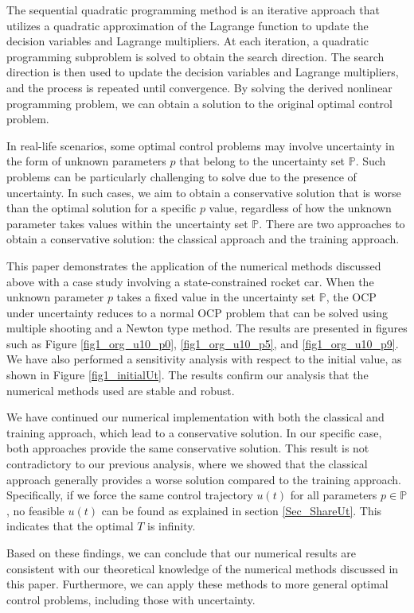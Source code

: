 \documentclass  [
  paper    = a4,
  BCOR     = 10mm,
  twoside,
  fontsize = 12pt,
  fleqn,
  toc      = bibnumbered,
  toc      = listofnumbered,
  numbers  = noendperiod,
  headings = normal,
  listof   = leveldown,
  version  = 3.03
]                                       {scrreprt}
\newcommand{\<}{\langle}
\renewcommand{\>}{\rangle}
\begin{document}
The sequential quadratic programming method is an iterative approach that utilizes a quadratic approximation of the Lagrange function to update the decision variables and Lagrange multipliers. At each iteration, a quadratic programming subproblem is solved to obtain the search direction. The search direction is then used to update the decision variables and Lagrange multipliers, and the process is repeated until convergence. By solving the derived nonlinear programming problem, we can obtain a solution to the original optimal control problem.


In real-life scenarios, some optimal control problems may involve uncertainty in the form of unknown parameters $p$ that belong to the uncertainty set $\mathbb{P}$. Such problems can be particularly challenging to solve due to the presence of uncertainty. In such cases, we aim to obtain a conservative solution that is worse than the optimal solution for a specific $p$ value, regardless of how the unknown parameter takes values within the uncertainty set $\mathbb{P}$. There are two approaches to obtain a conservative solution: the classical approach and the training approach.

This paper demonstrates the application of the numerical methods discussed above with a case study involving a state-constrained rocket car. When the unknown parameter $p$ takes a fixed value in the uncertainty set $\mathbb{P}$, the OCP under uncertainty reduces to a normal OCP problem that can be solved using multiple shooting and a Newton type method. The results are presented in figures such as Figure \ref{fig1_org_u10_p0}, \ref{fig1_org_u10_p5}, and \ref{fig1_org_u10_p9}. We have also performed a sensitivity analysis with respect to the initial value, as shown in Figure \ref{fig1_initialUt}. The results confirm our analysis that the numerical methods used are stable and robust.

We have continued our numerical implementation with both the classical and training approach, which lead to a conservative solution. In our specific case, both approaches provide the same conservative solution. This result is not contradictory to our previous analysis, where we showed that the classical approach generally provides a worse solution compared to the training approach. Specifically, if we force the same control trajectory $u(t)$ for all parameters $p \in \mathbb{P}$, no feasible $u(t)$ can be found as explained in section \ref{Sec_ShareUt}. This indicates that the optimal $T$ is infinity.

Based on these findings, we can conclude that our numerical results are consistent with our theoretical knowledge of the numerical methods discussed in this paper. Furthermore, we can apply these methods to more general optimal control problems, including those with uncertainty.
\end{document}
